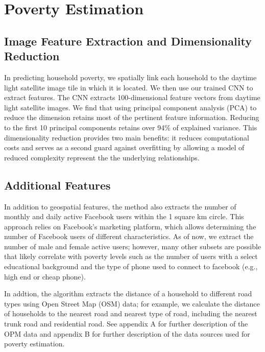 \documentclass[8pt, oneside]{article}
\begin{document}
\section*{Poverty Estimation}

\subsection*{Image Feature Extraction and Dimensionality Reduction}
In predicting household poverty, we spatially link each household to the daytime light satellite image tile in which it is located. We then use our trained CNN to extract features. The CNN extracts 100-dimensional feature vectors from daytime light satellite images. We find that using principal component analysis (PCA) to reduce the dimension retains most of the pertinent feature information. Reducing to the first 10 principal components retains over 94\% of explained variance. This dimensionality reduction provides two main benefits: it reduces computational costs and serves as a second guard against overfitting by allowing a model of reduced complexity represent the the underlying relationships.

\subsection*{Additional Features}
In addition to geospatial features, the method also extracts the number of monthly and daily active Facebook users within the 1 square km circle. This approach relies on Facebook's marketing platform, which allows determining the number of Facebook users of different characteristics. As of now, we extract the number of male and female active users; however, many other subsets are possible that likely correlate with poverty levels such as the number of users with a select educational background and the type of phone used to connect to facebook (e.g., high end or cheap phone). 
\par
In addtion, the algorithm extracts the distance of a household to different road types using Open Street Map (OSM) data; for example, we calculate the distance of households to the nearest road and nearest type of road, including the nearest trunk road and residential road. See appendix A for further description of the OPM data and appendix B for further description of the data sources used for poverty estimation.
\end{document}
